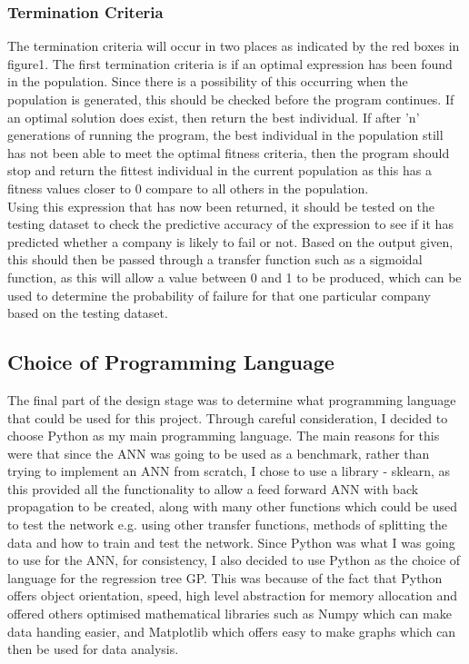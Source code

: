 \documentclass[11pt]{article}
\begin{document}
\subsubsection{Termination Criteria}
The termination criteria will occur in two places as indicated by the red boxes in figure1. The first termination criteria is if an optimal expression has been found in the population. Since there is a possibility of this occurring when the population is generated, this should be checked before the program continues. If an optimal solution does exist, then return the best individual. If after 'n' generations of running the program, the best individual in the population still has not been able to meet the optimal fitness criteria, then the program should stop  and return the fittest individual in the current population as this has a fitness values closer to 0 compare to all others in the population.  \\
Using this expression that has now been returned, it should be tested on the testing dataset to check the predictive accuracy of the expression to see if it has predicted whether a company is likely to fail or not. Based on the output given, this should then be passed through a transfer function such as a sigmoidal function, as this will allow a value between 0 and 1 to be produced, which can be used to determine the probability of failure for that one particular company based on the testing dataset. 

\subsection{Choice of Programming Language}
The final part of the design stage was to determine what programming language that could be used for this project. Through careful consideration, I decided to choose Python as my main programming language. The main reasons for this were that since the ANN was going to be used as a benchmark, rather than trying to implement an ANN from scratch, I chose to use a library - sklearn, as this provided all the functionality to allow a feed forward ANN with back propagation to be created, along with many other functions which could be used to test the network e.g. using other transfer functions, methods of splitting the data and how to train and test the network. Since Python was what I was going to use for the ANN, for consistency, I also decided to use Python as the choice of language for the regression tree GP. This was because of the fact that Python offers object orientation, speed, high level abstraction for memory allocation and offered others optimised mathematical libraries such as Numpy which can make data handing easier, and Matplotlib which offers easy to make graphs which can then be used for data analysis.
\end{document}
